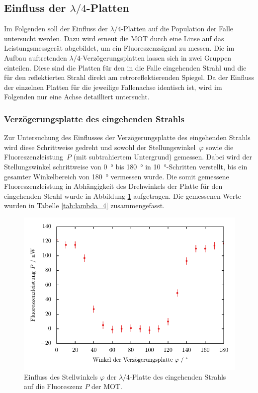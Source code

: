 \documentclass[11pt, a4paper]{article}
\numberwithin{equation}{section}
\begin{document}
\subsection{Einfluss der $\lambda / 4$-Platten}
Im Folgenden soll der Einfluss der $\lambda / 4$-Platten auf die Population der Falle untersucht werden.
Dazu wird erneut die MOT durch eine Linse auf das Leistungsmessgerät abgebildet, um ein Fluoreszenzsignal zu messen.
Die im Aufbau auftretenden $\lambda / 4$-Verzögerungsplatten lassen sich in zwei Gruppen einteilen.
Diese sind die Platten für den in die Falle eingehenden Strahl und die für den reflektierten Strahl direkt am retroreflektierenden Spiegel.
Da der Einfluss der einzelnen Platten für die jeweilige Fallenachse identisch ist, wird im Folgenden nur eine Achse detailliert untersucht.

\subsubsection{Verzögerungsplatte des eingehenden Strahls}
\label{sec:lambda_4_inc}
Zur Untersuchung des Einflusses der Verzögerungsplatte des eingehenden Strahls wird diese Schrittweise gedreht und sowohl der Stellungswinkel~$\varphi$ sowie die Fluoreszenzleistung~$P$ (mit subtrahiertem Untergrund) gemessen.
Dabei wird der Stellungswinkel schrittweise von \SI{0}{\degree} bis \SI{180}{\degree} in \SI{10}{\degree}-Schritten verstellt, bis ein gesamter Winkelbereich von \SI{180}{\degree} vermessen wurde.
Die somit gemessene Fluoreszenzleistung in Abhängigkeit des Drehwinkels der Platte für den eingehenden Strahl wurde in Abbildung \ref{fig:lambda_4_inc} aufgetragen.
Die gemessenen Werte wurden in Tabelle \ref{tab:lambda_4} zusammengefasst.
\begin{figure}[h]
	\centering
	\includegraphics{./figures/lambda_4_in.pdf}
	\caption{Einfluss des Stellwinkels $\varphi$ der $\lambda / 4$-Platte des eingehenden Strahls auf die Fluoreszenz $P$ der MOT.}
	\label{fig:lambda_4_inc}
\end{figure}
\end{document}
